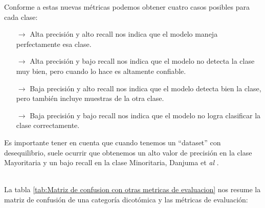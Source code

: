 \begin{itemize}
    Conforme a estas nuevas métricas podemos obtener cuatro casos posibles para cada clase:
    \begin{itemize}
    \begin{itemize}
        \item[$\rightarrow$] Alta precisión y alto recall nos indica que el modelo maneja perfectamente esa clase.
        \item[$\rightarrow$] Alta precisión y bajo recall nos indica que el modelo no detecta la clase muy bien, pero cuando lo hace es altamente confiable.
        \item[$\rightarrow$] Baja precisión y alto recall nos indica que el modelo detecta bien la clase,  pero también incluye muestras de la otra clase.
       \item[$\rightarrow$] Baja precisión y bajo recall nos indica que el modelo no logra clasificar la clase correctamente.
    \end{itemize}
    \end{itemize}
    
Es importante tener en cuenta que cuando tenemos un “dataset” con desequilibrio, suele ocurrir que obtenemos un alto valor de precisión en la clase Mayoritaria y un bajo recall en la clase Minoritaria, Danjuma et \textit{al} \cite{danjuma2015performance}.
\end{itemize} \\

La tabla \ref{tab:Matriz de confusion con otras metricas de evaluacion} nos resume la matriz de confusión de una categoría dicotómica y las métricas de evaluación:

